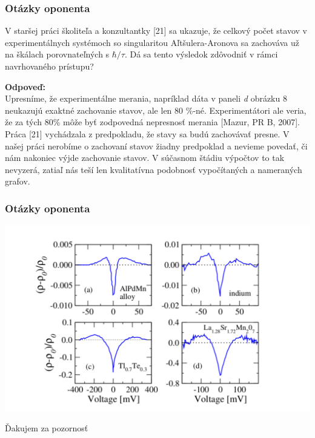 \documentclass[
	11pt, %
]{beamer}
\begin{document}
\begin{frame}
\frametitle{Otázky oponenta}
 V staršej práci školiteľa a konzultantky [21] sa ukazuje, že celkový počet stavov v
experimentálnych systémoch so singularitou Aľtšulera-Aronova sa zachováva už na
škálach porovnateľných s $\hbar/\tau$. Dá sa tento výsledok zdôvodniť v rámci navrhovaného
prístupu?

\vspace{5mm}
\textbf{Odpoveď:}\\
Upresníme, že experimentálne merania, napríklad dáta v paneli \emph{d} obrázku 8 neukazujú exaktné zachovanie stavov, ale len 80 \%-né. Experimentátori ale veria, že za tých 80\% môže byť zodpovedná nepresnosť merania  [Mazur, PR B, 2007]. Práca [21] vychádzala z predpokladu, že stavy sa budú zachovávať presne. V našej práci nerobíme o zachovaní stavov žiadny predpoklad a nevieme povedať, či nám nakoniec výjde zachovanie stavov. V súčasnom štádiu výpočtov to tak nevyzerá, zatiaľ nás teší len kvalitatívna podobnosť vypočítaných a nameraných grafov.
\end{frame}
\begin{frame}
\frametitle{Otázky oponenta}
\includegraphics[scale=0.5]{grafy/B2}
\end{frame}
\begin{frame}
\centering
\Huge{Ďakujem za pozornosť}
\end{frame}

\end{document}
